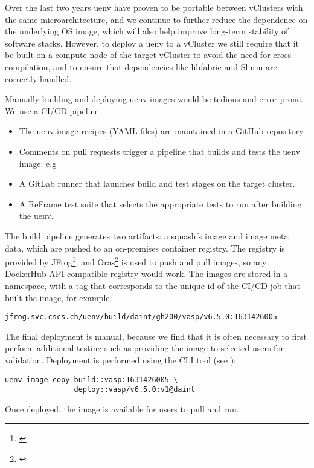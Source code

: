 Over the last two years uenv have proven to be portable between vClusters with the same microarchitecture, and we continue to further reduce the dependence on the underlying OS image, which will also help improve long-term stability of software stacks.
However, to deploy a uenv to a vCluster we still require that it be built on a compute node of the target vCluster to avoid the need for cross compilation, and to ensure that dependencies like libfabric and Slurm are correctly handled.

Manually building and deploying uenv images would be tedious and error prone.
We use a CI/CD pipeline 
\begin{itemize}
    \item The uenv image recipes (YAML files) are maintained in a GitHub repository.
    \item Comments on pull requests trigger a pipeline that builds and tests the uenv image: e.g 
    \item A GitLab runner that launches build and test stages on the target cluster.
    \item A ReFrame test suite that selects the appropriate tests to run after building the uenv.
\end{itemize}


The build pipeline generates two artifacts: a squashfs image and image meta data, which are pushed to an on-premises container registry.
The registry is provided by JFrog\footnote{\href{https://jfrog.com}{}}, and Oras\footnote{\href{https://oras.land}{}} is used to push and pull images, so any DockerHub API compatible registry would work.
The images are stored in a  namespace, with a tag that corresponds to the unique id of the CI/CD job that built the image, for example:
\begin{lstlisting}
jfrog.svc.cscs.ch/uenv/build/daint/gh200/vasp/v6.5.0:1631426005
\end{lstlisting}

The final deployment is manual, because we find that it is often necessary to first perform additional testing such as providing the image to selected users for validation.
Deployment is performed using the CLI tool (see ):
\begin{lstlisting}
uenv image copy build::vasp:1631426005 \
                deploy::vasp/v6.5.0:v1@daint
\end{lstlisting}
Once deployed, the image is available for users to pull and run.

